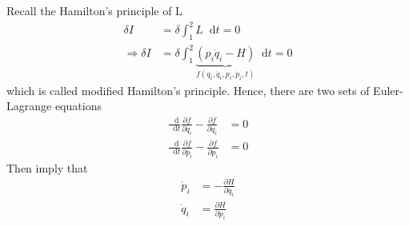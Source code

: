 \documentclass[twoside,9pt]{article}
\numberwithin{equation}{section} %
\renewcommand*\d{\mathop{}\!\mathrm{d}}
\theoremstyle{definition}
\theoremstyle{remark}
\begin{document}
Recall the Hamilton's principle of L
\begin{align}
    \delta I &= \delta \int_1^2 L\d t = 0\\
    \Rightarrow
    \delta I &=
    \delta\int_1^2
    \underbrace{
        (p_i\dot q_i - H)
    }_{f(q_i,\dot q_i, p_i, \dot p_i, t)} \d t
    = 0
\end{align}
which is called modified Hamilton's principle.
Hence, there are two sets of Euler-Lagrange equations
\begin{align}
    \frac{\d}{\d t}\frac{\partial f}{\partial\dot q_i}
    - \frac{\partial f}{\partial q_i} &= 0\\
    \frac{\d}{\d t}\frac{\partial f}{\partial\dot p_i}
    - \frac{\partial f}{\partial p_i} &= 0
\end{align}
Then imply that
\begin{align}
    \dot p_i &= -\frac{\partial H}{\partial q_i}\\
    \dot q_i &=  \frac{\partial H}{\partial p_i}
\end{align}
\end{document}
